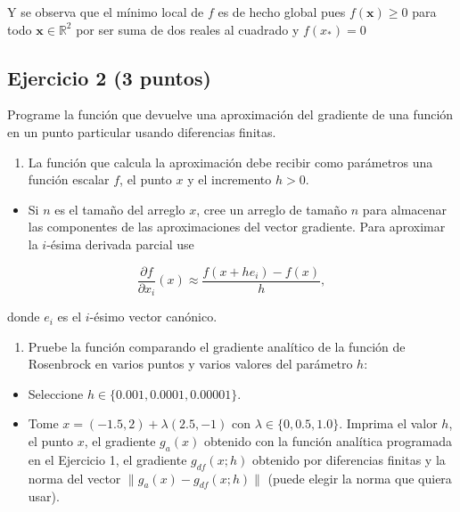 \documentclass[11pt]{article}
\providecommand{\tightlist}{%
      \setlength{\itemsep}{0pt}\setlength{\parskip}{0pt}}
\begin{document}
    Y se observa que el mínimo local de \(f\) es de hecho global pues
\(f(\mathbf{x})\geq 0\) para todo \(\mathbf{x}\in\mathbb{R}^2\) por ser
suma de dos reales al cuadrado y \(f(x_{\ast})=0\)

    \hypertarget{ejercicio-2-3-puntos}{%
\subsection{Ejercicio 2 (3 puntos)}\label{ejercicio-2-3-puntos}}

Programe la función que devuelve una aproximación del gradiente de una
función en un punto particular usando diferencias finitas.

\begin{enumerate}
\def\labelenumi{\arabic{enumi}.}
\tightlist
\item
  La función que calcula la aproximación debe recibir como parámetros
  una función escalar \(f\), el punto \(x\) y el incremento \(h>0\).
\end{enumerate}

\begin{itemize}
\tightlist
\item
  Si \(n\) es el tamaño del arreglo \(x\), cree un arreglo de tamaño
  \(n\) para almacenar las componentes de las aproximaciones del vector
  gradiente. Para aproximar la \(i\)-ésima derivada parcial use
\end{itemize}

\[ \frac{\partial f}{\partial x_i}(x) \approx
\frac{f(x + he_i) - f(x)}{h}, \]

donde \(e_i\) es el \(i\)-ésimo vector canónico.

\begin{enumerate}
\def\labelenumi{\arabic{enumi}.}
\setcounter{enumi}{1}
\tightlist
\item
  Pruebe la función comparando el gradiente analítico de la función de
  Rosenbrock en varios puntos y varios valores del parámetro \(h\):
\end{enumerate}

\begin{itemize}
\item
  Seleccione \(h \in \{0.001, 0.0001, 0.00001 \}\).
\item
  Tome \(x = (-1.5,2) + \lambda (2.5,-1)\) con
  \(\lambda \in \{0, 0.5, 1.0\}\). Imprima el valor \(h\), el punto
  \(x\), el gradiente \(g_{a}(x)\) obtenido con la función analítica
  programada en el Ejercicio 1, el gradiente \(g_{df}(x;h)\) obtenido
  por diferencias finitas y la norma del vector
  \(\|g_{a}(x) - g_{df}(x;h)\|\) (puede elegir la norma que quiera
  usar).
\end{itemize}
\end{document}
